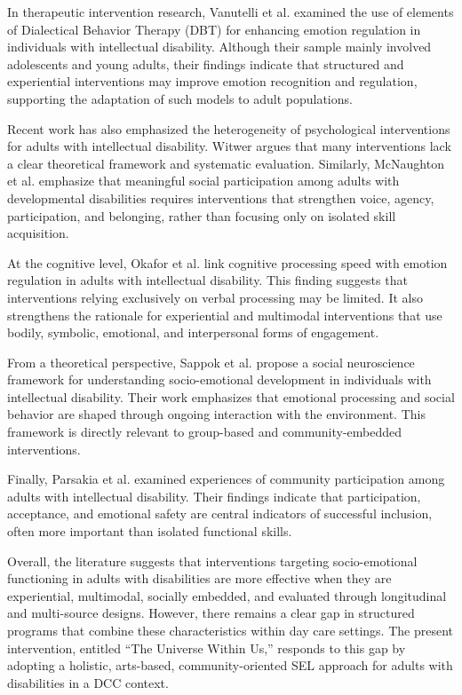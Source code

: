 \documentclass[journal]{IEEEtran}
\begin{document}
In therapeutic intervention research, Vanutelli et al. \cite{vanutelli2023} examined the use of elements of Dialectical Behavior Therapy (DBT) for enhancing emotion regulation in individuals with intellectual disability. Although their sample mainly involved adolescents and young adults, their findings indicate that structured and experiential interventions may improve emotion recognition and regulation, supporting the adaptation of such models to adult populations.

Recent work has also emphasized the heterogeneity of psychological interventions for adults with intellectual disability. Witwer \cite{witwer2025} argues that many interventions lack a clear theoretical framework and systematic evaluation. Similarly, McNaughton et al. \cite{mcnaughton2025} emphasize that meaningful social participation among adults with developmental disabilities requires interventions that strengthen voice, agency, participation, and belonging, rather than focusing only on isolated skill acquisition.

At the cognitive level, Okafor et al. \cite{okafor2025} link cognitive processing speed with emotion regulation in adults with intellectual disability. This finding suggests that interventions relying exclusively on verbal processing may be limited. It also strengthens the rationale for experiential and multimodal interventions that use bodily, symbolic, emotional, and interpersonal forms of engagement.

From a theoretical perspective, Sappok et al. \cite{sappok2022} propose a social neuroscience framework for understanding socio-emotional development in individuals with intellectual disability. Their work emphasizes that emotional processing and social behavior are shaped through ongoing interaction with the environment. This framework is directly relevant to group-based and community-embedded interventions.

Finally, Parsakia et al. \cite{parsakia2024} examined experiences of community participation among adults with intellectual disability. Their findings indicate that participation, acceptance, and emotional safety are central indicators of successful inclusion, often more important than isolated functional skills.

Overall, the literature suggests that interventions targeting socio-emotional functioning in adults with disabilities are more effective when they are experiential, multimodal, socially embedded, and evaluated through longitudinal and multi-source designs. However, there remains a clear gap in structured programs that combine these characteristics within day care settings. The present intervention, entitled ``The Universe Within Us,'' responds to this gap by adopting a holistic, arts-based, community-oriented SEL approach for adults with disabilities in a DCC context.
\end{document}

